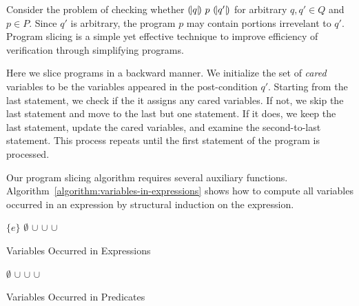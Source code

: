 
Consider the problem of checking whether ${(\!|}{q}{|\!)}~{p}~{(\!|}{q'}{|\!)}$ for
arbitrary $q, q' \in Q$ and $p \in P$. Since $q'$ is arbitrary, the
program $p$ may contain portions irrevelant to $q'$. Program slicing
is a simple yet effective technique to improve efficiency of
verification through simplifying programs.  

Here we slice programs in a backward manner. We initialize the set
of \emph{cared} variables to be the variables appeared in the
post-condition $q'$. Starting from the last statement, we check if the
it assigns any cared variables. If not, we skip the last statement and
move to the last but one statement. If it does, we keep the last
statement, update the cared variables, and examine the second-to-last
statement. This process repeats until the first statement of the
program is processed.

Our program slicing algorithm requires several auxiliary functions. 
Algorithm~\ref{algorithm:variables-in-expressions} shows how to
compute all variables occurred in an expression by structural
induction on the expression. 

\begin{algorithm}
  \begin{algorithmic}[1]
        \Return $\{ e \}$
      \EndCase
        \Return $\emptyset$
      \EndCase
        \Return {}
      \EndCase
        \Return {} $\cup$ 
      \EndCase
        \Return {} $\cup$ 
      \EndCase
        \Return {} $\cup$ 
      \EndCase
        \Return {}
      \EndCase
    \EndMatch
    \EndFunction
  \end{algorithmic}
  \caption{Variables Occurred in Expressions}
  \label{algorithm:variables-in-expressions}
\end{algorithm}

\begin{algorithm}
\begin{algorithmic}[1]
    \Case{$\top$}
      $\emptyset$
    \EndCase
      \Return {} $\cup$ 
    \EndCase
      \Return {} $\cup$ 
    \EndCase
      \Return {} $\cup$ 
    \EndCase
  \EndMatch
  \EndFunction
\end{algorithmic}
\caption{Variables Occurred in Predicates}
\label{algorithm:variables-in-predicates}
\end{algorithm}

